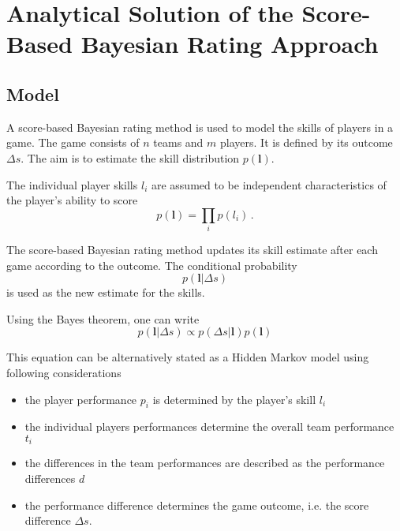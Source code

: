 \documentclass{article}
\begin{document}
\author{Markus D\"uttmann}



\section{Analytical Solution of the Score-Based Bayesian Rating Approach}



\subsection{Model}

A score-based Bayesian rating method is used to model the skills of players in a game. The game consists of $n$ teams and $m$ players. It is defined by its outcome $\Delta s$. The aim is to estimate the skill distribution $p(\mathbf{l})$. 

The individual player skills $l_i$ are assumed to be independent characteristics of the player's ability to score
\begin{equation}
p(\mathbf{l}) = \prod_i p(l_i)\, .
\end{equation}

The score-based Bayesian rating method updates its skill estimate after each game according to the outcome. The conditional probability 
\begin{equation}
p(\mathbf{l} | \Delta s) 
\end{equation}
is used as the new estimate for the skills.

Using the Bayes theorem, one can write
\begin{equation}
p(\mathbf{l} | \Delta s) \propto p( \Delta s | \mathbf{l} ) p(\mathbf{l})
\end{equation}

This equation can be alternatively stated as a Hidden Markov model using following considerations
\begin{itemize}
\item the player performance $p_i$ is determined by the player's skill $l_i$
\item the individual players performances determine the overall team performance $t_i$
\item the differences in the team performances are described as the performance differences $d$
\item the performance difference determines the game outcome, i.e. the score difference $\Delta s$.
\end{itemize}
\end{document}
